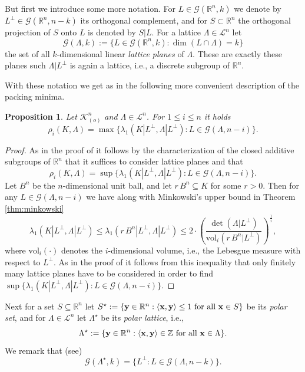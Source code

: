 \documentclass{amsart}
\newtheorem{prop}[theorem]{Proposition}
\theoremstyle{definition}
\theoremstyle{remark}
\numberwithin{equation}{section}
\begin{document}
But first we introduce some more notation. For $L\in\mathcal{G}(\mathbb{R}^n,k)$ we denote by $L^\perp\in \mathcal{G}(\mathbb{R}^n,n-k)$ its orthogonal complement, and for $S\subset\mathbb{R}^n$ the orthogonal projection of $S$ onto $L$ is denoted by $S|L$. For a lattice $\Lambda\in\mathcal{L}^n$ let 
$$\mathcal{G}(\Lambda,k):=\{L\in\mathcal{G}(\mathbb{R}^n,k):\dim(L\cap\Lambda)=k\}$$
the set of all $k$-dimensional linear {\it lattice planes} of $\Lambda$.  
These are exactly these planes such $\Lambda|L^\perp$ is again a lattice, 
i.e., a discrete subgroup of $\mathbb{R}^n$. 

With these notation we get as in \cite[Lemma 2.1]{hsx2021} 
the following more convenient description of the packing minima.  

\begin{prop} Let ${\mathcal K}^n_{(o)}$ and $\Lambda\in{\mathcal L}^n$. For $1\leq i\leq n$ it holds 
\begin{equation*}
  \rho_i(K,\Lambda)=\max\{\lambda_1(K|L^\perp,\Lambda|L^\perp): L\in \mathcal{G}(\Lambda,n-i)\}.
\end{equation*}
\label{prop:projdef}
\end{prop}
\begin{proof} As in the proof of \cite[Lemma 2.1]{hsx2021} it follows by the characterization of the closed additive subgroups of $\mathbb{R}^n$ that it suffices to consider lattice planes and that  
\begin{equation*}
  \rho_i(K,\Lambda)=  \sup\{\lambda_1(K|L^\perp,\Lambda|L^\perp): L\in \mathcal{G}(\Lambda,n-i)\}.
\end{equation*}
Let $B^n$ be the $n$-dimensional unit ball, and let $r\,B^n\subseteq K$ for some $r>0$. Then for any $L\in \mathcal{G}(\Lambda,n-i)$ we have along with Minkowski's upper bound in Theorem \ref{thm:minkowski} 
$$
\lambda_1(K|L^\perp,\Lambda|L^\perp)\leq \lambda_1(r\,B^n|L^\perp,\Lambda|L^\perp)\leq 2\cdot\left(\frac{\det(\Lambda|L^\perp)}{\mathrm{vol}_i(r\,B^n|L^\perp)}\right)^\frac{1}{i},
$$
where $\mathrm{vol}_i(\cdot)$ denotes the $i$-dimensional volume, i.e., the Lebesgue measure with respect to $L^\perp$. As in the proof of \cite[Lemma 2.1]{hsx2021} it follows from this inequality that only finitely many lattice planes 
have to be considered in order to find $\sup\{\lambda_1(K|L^\perp,\Lambda|L^\perp): L\in \mathcal{G}(\Lambda,n-i)\}$. 
\end{proof}

Next for a set $S\subseteq\mathbb{R}^n$ let $S^\star:=\{{\bf y}\in\mathbb{R}^n: \langle {\bf x},{\bf y}\rangle\leq 1 \text{ for all }{\bf x}\in S\}$ be its {\it polar set}, and for $\Lambda\in \mathcal{L}^n$ let $\Lambda^\star$ be its {\it polar lattice}, i.e., 
$$
\Lambda^\star:= \{{\bf y}\in\mathbb{R}^n :\langle {\bf x},{\bf y}\rangle\in\mathbb{Z}\text{ for all }{\bf x}\in \Lambda\}.
$$
We remark that (see) 
\begin{equation}
          \mathcal{G}(\Lambda^\star,k)=\{L^\perp: L\in \mathcal{G}(\Lambda,n-k)\}.
\label{eq:polarplane}          
\end{equation}
\end{document}
